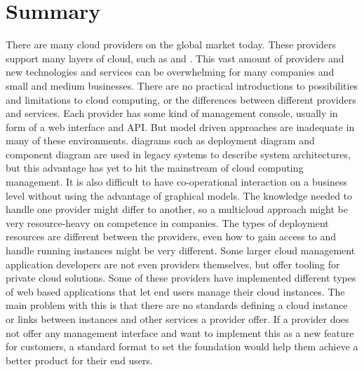 \section{Summary}

There are many cloud providers on the global market today. 
These providers support many layers of cloud, such as  and .
This vast amount of providers and new technologies and services can be overwhelming 
for many companies and small and medium businesses. 
There are no practical introductions to possibilities and limitations to cloud computing, 
or the differences between different providers and services. 
Each provider has some kind of management console, usually in form of a web interface and API. 
But model driven approaches are inadequate in many of these environments. 
 diagrams such as deployment diagram and component diagram are used in legacy systems 
to describe system architectures, 
but this advantage has yet to hit the mainstream of cloud computing management. 
It is also difficult to have co-operational interaction on a business level without 
using the advantage of graphical models.
The knowledge needed to handle one provider might differ to another, 
so a multicloud approach might be very resource-heavy on competence in companies. 
The types of deployment resources are different between the providers, 
even how to gain access to and handle running instances might be very different. 
Some larger cloud management application developers are not even providers themselves, 
but offer tooling for private cloud solutions.
Some of these providers have implemented different types of web based applications 
that let end users manage their cloud instances. 
The main problem with this is that there are no standards defining a 
cloud instance or links between instances and other services a provider offer.
If a provider does not offer any management interface and want to implement this as a new feature for customers, 
a standard format to set the foundation would help them achieve a better product for their end users.
